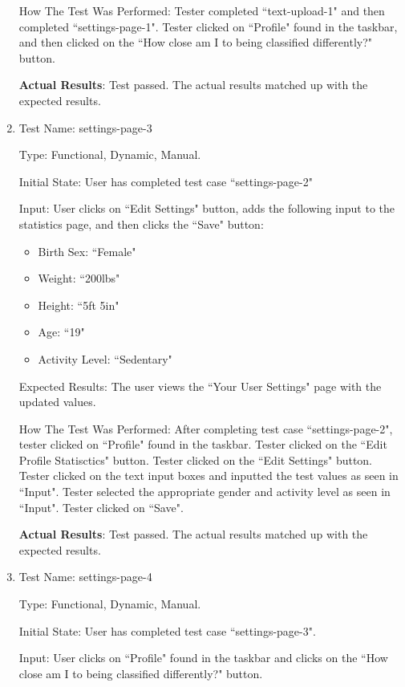 \documentclass[12pt, titlepage]{article}
\begin{document}
\begin{enumerate}
		How The Test Was Performed: Tester completed ``text-upload-1" and then completed ``settings-page-1". Tester clicked on ``Profile" found in the taskbar, and then clicked on the ``How close am I to being classified differently?" button.
		
		\textbf{Actual Results}: Test passed. The actual results matched up with the expected results.
		
		\item{Test Name: settings-page-3}
		
		Type: Functional, Dynamic, Manual.
		
		Initial State: User has completed test case ``settings-page-2"
		
		Input: User clicks on ``Edit Settings" button, adds the following input to the statistics page, and then clicks the ``Save" button:
		
		\begin{itemize}
			\item Birth Sex: ``Female"
			\item Weight: ``200lbs"
			\item Height: ``5ft 5in"
			\item Age: ``19"
			\item Activity Level: ``Sedentary"
		\end{itemize}
		
		Expected Results: The user views the ``Your User Settings" page with the updated values.
		
		How The Test Was Performed: After completing test case ``settings-page-2", tester clicked on ``Profile" found in the taskbar. Tester clicked on the ``Edit Profile Statisctics" button. Tester clicked on the ``Edit Settings" button. Tester clicked on the text input boxes and inputted the test values as seen in ``Input". Tester selected the appropriate gender and activity level as seen in ``Input". Tester clicked on ``Save".
		
		\textbf{Actual Results}: Test passed. The actual results matched up with the expected results.
		
		\item{Test Name: settings-page-4}
		
		Type: Functional, Dynamic, Manual.
		
		Initial State: User has completed test case ``settings-page-3".
		
		Input: User clicks on ``Profile" found in the taskbar and clicks on the ``How close am I to being classified differently?" button.
		

\end{enumerate}
\end{document}
